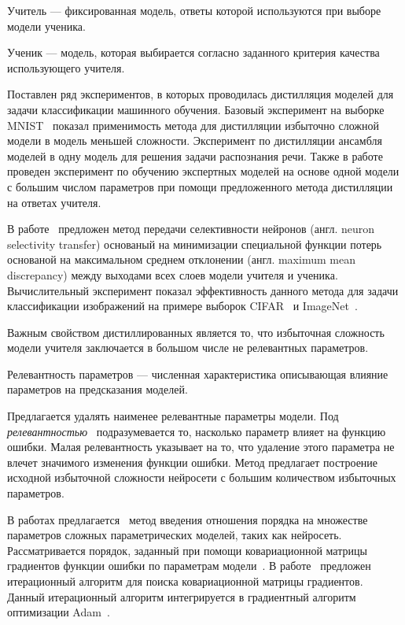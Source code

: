 \begin{definition}
Учитель --- фиксированная модель, ответы которой используются при выборе модели ученика.
\end{definition}

\begin{definition}
Ученик --- модель, которая выбирается согласно заданного критерия качества использующего учителя.
\end{definition}



Поставлен ряд экспериментов, в которых проводилась дистилляция моделей для задачи классификации машинного обучения.
Базовый эксперимент на выборке MNIST~\cite{mnist} показал применимость метода для дистилляции избыточно сложной модели в модель меньшей сложности.
Эксперимент по дистилляции ансамбля моделей в одну модель для решения задачи распознания речи. Также в работе~\cite{Hinton2015} проведен эксперимент по обучению экспертных моделей на основе одной модели с большим числом параметров при помощи предложенного метода дистилляции на ответах учителя.

В работе~\cite{Zehao2017} предложен метод передачи селективности нейронов (англ. neuron selectivity transfer) основаный на минимизации специальной функции потерь основаной на максимальном среднем отклонении (англ. maximum mean discrepancy) между выходами всех слоев модели учителя и ученика. Вычислительный эксперимент показал эффективность данного метода для задачи классификации изображений на примере выборок CIFAR~\cite{cifar10} и ImageNet~\cite{imagenet}.

Важным свойством дистиллированных является то, что избыточная сложность модели учителя заключается в большом числе не релевантных параметров.
\begin{definition}
Релевантность параметров --- численная характеристика описывающая влияние параметров на предсказания моделей.
\end{definition}
Предлагается удалять наименее релевантные параметры модели. Под \textit{релевантностью}~\cite{cun1990} подразумевается то, насколько параметр влияет на функцию ошибки. Малая релевантность указывает на то, что удаление этого параметра не влечет значимого изменения функции ошибки. Метод предлагает построение исходной избыточной сложности нейросети с большим количеством избыточных параметров.

В работах предлагается~\cite{cun1990,graves2011} метод введения отношения порядка на множестве параметров сложных параметрических моделей, таких как нейросеть. Рассматривается порядок, заданный при помощи ковариационной матрицы градиентов функции ошибки по параметрам модели~\cite{Mandt2017}. В работе~\cite{Chunyan2016} предложен итерационный алгоритм для поиска ковариационной матрицы градиентов. Данный итерационный алгоритм интегрируется в градиентный алгоритм оптимизации Adam~\cite{kingma2014}.

